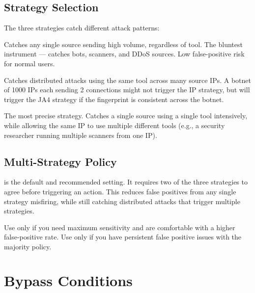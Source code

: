 \subsection{Strategy Selection}

The three strategies catch different attack patterns:

\begin{description}[leftmargin=4.5cm]
  \item[\configkey{by\_ip}] Catches any single source sending high volume,
    regardless of tool. The bluntest instrument — catches bots, scanners,
    and DDoS sources. Low false-positive risk for normal users.

  \item[\configkey{by\_ja4}] Catches distributed attacks using the same tool
    across many source IPs. A botnet of 1000 IPs each sending 2 connections
    might not trigger the IP strategy, but will trigger the JA4 strategy if
    the fingerprint is consistent across the botnet.

  \item[\configkey{by\_ip\_ja4\_pair}] The most precise strategy. Catches
    a single source using a single tool intensively, while allowing the same
    IP to use multiple different tools (e.g., a security researcher running
    multiple scanners from one IP).
\end{description}

\subsection{Multi-Strategy Policy}

 is the default and recommended
setting. It requires two of the three strategies to agree before triggering
an action. This reduces false positives from any single strategy misfiring,
while still catching distributed attacks that trigger multiple strategies.

Use  only if you need maximum sensitivity and are comfortable
with a higher false-positive rate. Use  only if you have
persistent false positive issues with the majority policy.

\section{Bypass Conditions}

